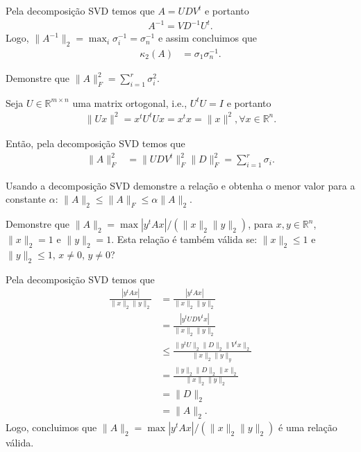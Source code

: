 \documentclass[a4paper,12pt, leqno, answers]{exam}
\begin{document}
\begin{questions}
\begin{solution}
        Pela decomposi\c{c}\~{a}o SVD temos que $A = U D V^t$ e portanto
        \begin{align*}
            A^{-1} = V D^{-1} U^t.
        \end{align*}
        Logo, $\| A^{-1} \|_2 = \max_i \sigma_i^{-1} = \sigma_n^{-1}$ e assim concluimos que
        \begin{align*}
            \kappa_2(A) &= \sigma_1 \sigma_n^{-1}.
        \end{align*}
    \end{solution}

     Demonstre que $\| A \|_F^2 = \sum_{i = 1}^r \sigma_i^2$.
    \begin{solution}
        Seja $U \in \mathbb{R}^{m \times n}$ uma matrix ortogonal, i.e., $U^t U = I$ e portanto
        \begin{align*}
            \| U x \|^2 = x^t U^t U x = x^t x = \| x \|^2, \forall x \in \mathbb{R}^n.
        \end{align*}

        Ent\~{a}o, pela decomposi\c{c}\~{a}o SVD temos que
        \begin{align*}
            \| A \|_F^2 &= \| U D V^t \|_F^2 \| D \|_F^2 = \sum_{i = 1}^r \sigma_i.
        \end{align*}
    \end{solution}

    \question Usando a decomposi\c{c}\~{a}o SVD demonstre a rela\c{c}\~{a}o e obtenha o menor valor para a constante $\alpha$: $\| A \|_2 \leq \| A \|_F \leq \alpha \| A \|_2$.
    \begin{solution}
    \end{solution}

    \question Demonstre que $\| A \|_2 = \max | y^t A x | / \left( \| x \|_2 \| y \|_2 \right)$, para $x, y \in \mathbb{R}^n$, $\| x \|_2 = 1$ e $\| y \|_2 = 1$. Esta rela\c{c}\~{a}o \'{e} tamb\'{e}m v\'{a}lida se: $\| x \|_2 \leq 1$ e $\| y \|_2 \leq 1$, $x \neq 0$, $y \neq 0$?
    \begin{solution}
        Pela decomposi\c{c}\~{a}o SVD temos que
        \begin{align*}
            \frac{| y^t A x |}{\| x \|_2 \| y \|_2} &= \frac{| y^t A x|}{\| x \|_2 \| y \|_2} \\
            &= \frac{| y^t U D V^t x |}{\| x \|_2 \| y \|_2} \\
            &\leq \frac{\| y^t U \|_2 \| D \|_2 \| V^t x \|_2}{\| x \|_2 \| y \|_y} \\
            &= \frac{\| y \|_2 \| D \|_2 \| x \|_2}{\| x \|_2 \| y \|_2} \\
            &= \| D \|_2 \\
            &= \| A \|_2.
        \end{align*}
        Logo, concluimos que $\| A \|_2 = \max | y^t A x | / \left( \| x \|_2 \| y \|_2 \right)$ \'{e} uma rela\c{c}\~{a}o v\'{a}lida. 
    \end{solution}


\end{questions}
\end{document}
